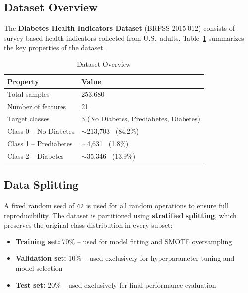 \documentclass[12pt,a4paper]{article}
\begin{document}
\subsection{Dataset Overview}

The \textbf{Diabetes Health Indicators Dataset} (BRFSS 2015 012) consists of survey-based health indicators collected from U.S.\ adults. Table~\ref{tab:dataset_overview} summarizes the key properties of the dataset.

\begin{table}[H]
    \centering
    \caption{Dataset Overview}
    \label{tab:dataset_overview}
    \begin{tabular}{ll}
        \toprule
        \textbf{Property} & \textbf{Value} \\
        \midrule
        Total samples          & 253,680 \\
        Number of features     & 21 \\
        Target classes         & 3 (No Diabetes, Prediabetes, Diabetes) \\
        Class 0 -- No Diabetes & $\sim$213,703 \ (84.2\%) \\
        Class 1 -- Prediabetes & $\sim$4,631 \ (1.8\%) \\
        Class 2 -- Diabetes    & $\sim$35,346 \ (13.9\%) \\
        \bottomrule
    \end{tabular}
\end{table}

\subsection{Data Splitting}

A fixed random seed of \texttt{42} is used for all random operations to ensure full reproducibility. The dataset is partitioned using \textbf{stratified splitting}, which preserves the original class distribution in every subset:

\begin{itemize}
    \item \textbf{Training set:} 70\% -- used for model fitting and SMOTE oversampling
    \item \textbf{Validation set:} 10\% -- used exclusively for hyperparameter tuning and model selection
    \item \textbf{Test set:} 20\% -- used exclusively for final performance evaluation
\end{itemize}
\end{document}

